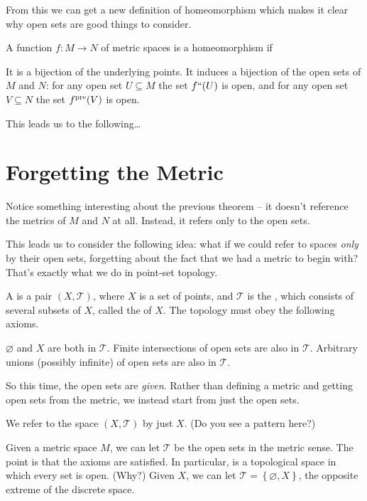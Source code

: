 From this we can get a new definition of homeomorphism
which makes it clear why open sets are good things to consider.
\begin{theorem}
	A function $f : M \to N$ of metric spaces is a homeomorphism if 
	\begin{enumerate}[(i)]
		\ii It is a bijection of the underlying points.
		\ii It induces a bijection of the open sets of $M$ and $N$:
		for any open set $U \subseteq M$ the set $f``(U)$ is open,
		and for any open set $V \subseteq N$ the set $f^{\text{pre}}(V)$ is open.
	\end{enumerate}
\end{theorem}


This leads us to the following\dots

\section{Forgetting the Metric}
Notice something interesting about the previous theorem -- it doesn't reference the metrics of $M$ and $N$ at all.
Instead, it refers only to the open sets.

This leads us to consider the following idea: what if we could refer to spaces \emph{only} by their open sets, forgetting about the fact that we had a metric to begin with?
That's exactly what we do in point-set topology.

\begin{definition}
	A  is a pair $(X, \mathcal T)$,
	where $X$ is a set of points,
	and $\mathcal T$ is the , which consists of several subsets of $X$, called the  of $X$.
	The topology must obey the following axioms.
	\begin{itemize}
		\ii $\varnothing$ and $X$ are both in $\mathcal T$.
		\ii Finite intersections of open sets are also in $\mathcal T$.
		\ii Arbitrary unions (possibly infinite) of open sets are also in $\mathcal T$.
	\end{itemize}
\end{definition}
So this time, the open sets are \emph{given}.
Rather than defining a metric and getting open sets from the metric,
we instead start from just the open sets.
\begin{abuse}
	We refer to the space $(X, \mathcal T)$ by just $X$.
	(Do you see a pattern here?)
\end{abuse}

\begin{example}
	\listhack
	\begin{enumerate}[(a)]
		\ii Given a metric space $M$, we can let $\mathcal T$ be
		the open sets in the metric sense.
		The point is that the axioms are satisfied.
		\ii In particular,  is a topological space in which every set is open. (Why?)
		\ii Given $X$, we can let $\mathcal T = \left\{ \varnothing, X \right\}$,
		the opposite extreme of the discrete space.
	\end{enumerate}
\end{example}

